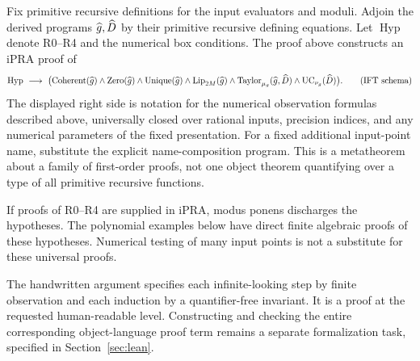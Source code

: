 Fix primitive recursive definitions for the input
evaluators and moduli. Adjoin the derived programs
\(\widehat g,\widehat D\) by their primitive recursive defining
equations. Let \(\operatorname{Hyp}\) denote R0--R4 and the
numerical box conditions. The proof above constructs an
iPRA proof of
\[
 \operatorname{Hyp}\ \longrightarrow\
 \bigl(\operatorname{Coherent}(\widehat g)
 \wedge\operatorname{Zero}(\widehat g)
 \wedge\operatorname{Unique}(\widehat g)
 \wedge\operatorname{Lip}_{2M}(\widehat g)
 \wedge\operatorname{Taylor}_{\mu_g}(\widehat g,\widehat D)
 \wedge\operatorname{UC}_{\nu_g}(\widehat D)\bigr).
 \tag{IFT schema}
\]
The displayed right side is notation for the numerical
observation formulas described above, universally closed
over rational inputs, precision indices, and any numerical
parameters of the fixed presentation. For a fixed additional
input-point name, substitute the explicit name-composition
program. This is a metatheorem about a family of first-order
proofs, not one object theorem quantifying over a type of
all primitive recursive functions.

If proofs of R0--R4 are supplied in iPRA, modus ponens
discharges the hypotheses. The polynomial examples below
have direct finite algebraic proofs of these hypotheses.
Numerical testing of many input points is not a substitute
for these universal proofs.

The handwritten argument specifies each infinite-looking
step by finite observation and each induction by a
quantifier-free invariant. It is a proof at the requested
human-readable level. Constructing and checking the entire
corresponding object-language proof term remains a separate
formalization task, specified in Section~\ref{sec:lean}.
